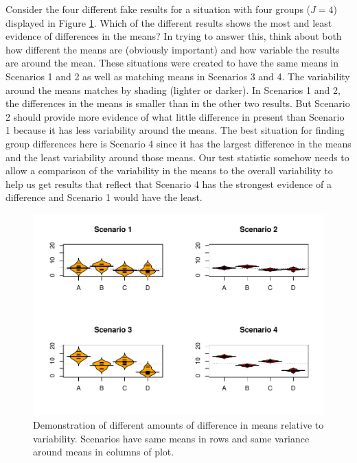 \documentclass[]{book}
\theoremstyle{definition}
\theoremstyle{definition}
\theoremstyle{remark}
\begin{document}
Consider the four different fake results for a situation with four
groups (\(J=4\)) displayed in Figure \ref{fig:Figure3-3}. Which of the
different results shows the most and least evidence of differences in
the means? In trying to answer this, think about both how different the
means are (obviously important) and how variable the results are around
the mean. These situations were created to have the same means in
Scenarios 1 and 2 as well as matching means in Scenarios 3 and 4. The
variability around the means matches by shading (lighter or darker). In
Scenarios 1 and 2, the differences in the means is smaller than in the
other two results. But Scenario 2 should provide more evidence of what
little difference in present than Scenario 1 because it has less
variability around the means. The best situation for finding group
differences here is Scenario 4 since it has the largest difference in
the means and the least variability around those means. Our test
statistic somehow needs to allow a comparison of the variability in the
means to the overall variability to help us get results that reflect
that Scenario 4 has the strongest evidence of a difference and Scenario
1 would have the least.





\begin{figure}
\centering
\includegraphics{03-oneWayAnova_files/figure-latex/Figure3-3-1.pdf}
\caption{\label{fig:Figure3-3}Demonstration of different amounts of difference in means
relative to variability. Scenarios have same means in rows and same
variance around means in columns of plot.}
\end{figure}
\end{document}
